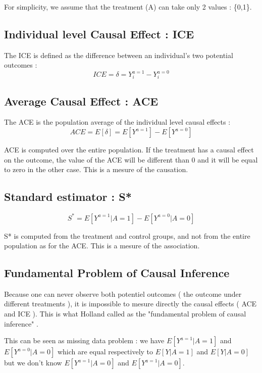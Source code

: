 \documentclass{article}
\begin{document}
For simplicity, we assume that the treatment (A) can take only 2 values : \{0,1\}.


\subsection{Individual level Causal Effect : ICE}
The ICE is defined as the difference between an individual’s two potential outcomes :
$$ ICE = \delta = Y_{i}^{a=1} - Y_{i}^{a=0} $$



\subsection{Average Causal Effect : ACE}
The ACE is the population average of the individual level causal effects :
$$ ACE = E[\delta] = E[Y^{a=1}] - E[Y^{a=0}] $$

ACE is computed over the entire population. If the treatment has a causal effect on the outcome, the value of the ACE will be different than 0 and it will be equal to zero in the other case. This is a mesure of the causation. 

\subsection{Standard estimator : S*}

$$ S^{*} = E[Y^{a=1}|A=1] - E[Y^{a=0}|A=0] $$

S* is computed from the treatment and control groups, and not from the entire population as for the ACE. This is a mesure of the association.


\subsection{Fundamental Problem of Causal Inference}

Because one can never observe both potentiel outcomes ( the outcome under different treatments ), it is impossible to mesure directly the causal effects ( ACE and ICE ). This is what Holland called as the "fundamental problem of causal inference" \cite{holland1986statistics}.

This can be seen as missing data problem : we have $E[Y^{a=1}|A=1]$ and $E[Y^{a=0}|A=0]$ which are equal respectively to $E[Y|A=1]$ and $E[Y|A=0]$ but we don't know  $E[Y^{a=1}|A=0]$ and $E[Y^{a=1}|A=0]$.
\end{document}
